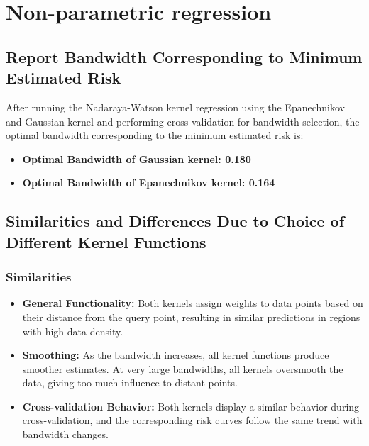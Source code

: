 \section{Non-parametric regression}

\subsection{Report Bandwidth Corresponding to Minimum Estimated Risk}

After running the Nadaraya-Watson kernel regression using the Epanechnikov and Gaussian kernel and performing cross-validation for bandwidth selection, the optimal bandwidth corresponding to the minimum estimated risk is:


\begin{itemize}
	\item \textbf{Optimal Bandwidth of Gaussian kernel: 0.180}
	\item \textbf{Optimal Bandwidth of Epanechnikov kernel: 0.164}
\end{itemize}


\subsection{Similarities and Differences Due to Choice of Different Kernel Functions}

\subsubsection{Similarities}
\begin{itemize}
	\item \textbf{General Functionality:} Both kernels assign weights to
	      data points based on their distance from the query point, resulting
	      in similar predictions in regions with high data density.
	\item \textbf{Smoothing:} As the bandwidth increases, all kernel
	      functions produce smoother estimates. At very large bandwidths, all
	      kernels oversmooth the data, giving too much influence to distant
	      points.
	\item \textbf{Cross-validation Behavior:} Both kernels display a
	      similar behavior during cross-validation, and the corresponding
	      risk curves follow the same trend with bandwidth changes.
\end{itemize}

